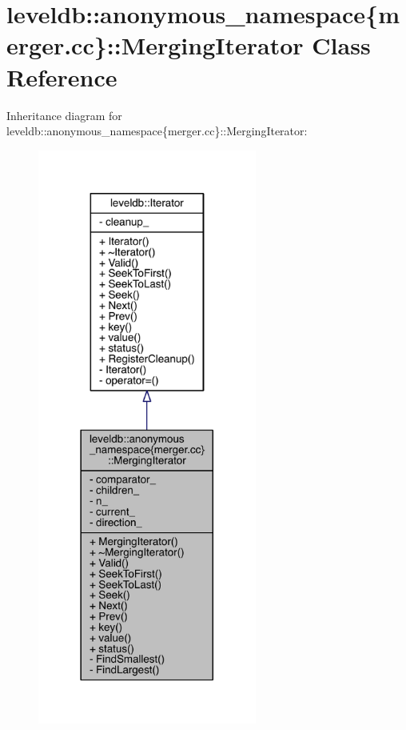 \hypertarget{classleveldb_1_1anonymous__namespace_02merger_8cc_03_1_1_merging_iterator}{}\section{leveldb\+:\+:anonymous\+\_\+namespace\{merger.\+cc\}\+:\+:Merging\+Iterator Class Reference}
\label{classleveldb_1_1anonymous__namespace_02merger_8cc_03_1_1_merging_iterator}


Inheritance diagram for leveldb\+:\+:anonymous\+\_\+namespace\{merger.\+cc\}\+:\+:Merging\+Iterator\+:
\nopagebreak
\begin{figure}[H]
\begin{center}
\leavevmode
\includegraphics[width=204pt]{classleveldb_1_1anonymous__namespace_02merger_8cc_03_1_1_merging_iterator__inherit__graph}
\end{center}
\end{figure}


